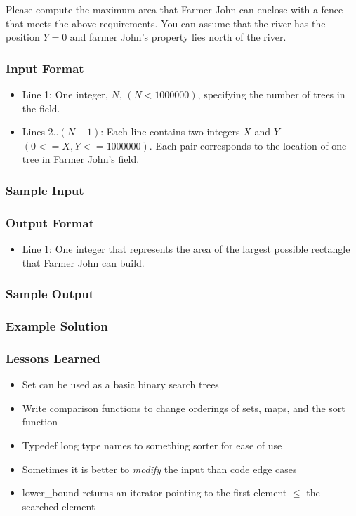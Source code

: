 Please compute the maximum area that Farmer John can enclose with a fence that meets the above requirements.
You can assume that the river has the position $Y=0$ and farmer John's property lies north of the river.

\subsubsection{Input Format}
\begin{itemize}
  \item Line 1: One integer, $N$, $(N < 1000000)$, specifying the number of trees in the field.
  \item Lines 2..$(N+1)$: Each line contains two integers $X$ and $Y$ $(0 <= X,Y <= 1000000)$.
        Each pair corresponds to the location of one tree in Farmer John's field.
\end{itemize}

\subsubsection{Sample Input}


\subsubsection{Output Format}
\begin{itemize}
  \item Line 1: One integer that represents the area of the largest possible rectangle that Farmer John can build.
\end{itemize}

\subsubsection{Sample Output}


\subsubsection{Example Solution}


\subsubsection{Lessons Learned}
\begin{itemize}
	\item	Set can be used as a basic binary search trees
	\item	Write comparison functions to change orderings of sets, maps, and the sort function
	\item	Typedef long type names to something sorter for ease of use
	\item	Sometimes it is better to \emph{modify} the input than code edge cases
	\item	lower\_bound returns an iterator pointing to the first element $\leq$ the searched element
\end{itemize}

